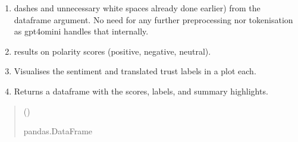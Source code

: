 \documentclass[letterpaper,10pt,english]{sphinxhowto}
\begin{document}
\begin{fulllineitems}
\label{\detokenize{_autosummary/custom_packages.modelling_modules.nlp_modelling.sentiment_analysis_using_gpt:custom_packages.modelling_modules.nlp_modelling.sentiment_analysis_using_gpt}}
\pysigstartsignatures
\pysiglinewithargsret
{}
{}
{}
\pysigstopsignatures\begin{enumerate}
%
\item {} \begin{description}
\sphinxAtStartPar
dashes and unnecessary white spaces already done earlier) from the dataframe argument. No need for any further
preprocessing nor tokenisation as gpt\sphinxhyphen{}4o\sphinxhyphen{}mini handles that internally.

\end{description}

\item {} \begin{description}
\sphinxAtStartPar
results on polarity scores (positive, negative, neutral).

\end{description}

\item {} 
\sphinxAtStartPar
Visualises the sentiment and translated trust labels in a plot each.

\item {} 
\sphinxAtStartPar
Returns a dataframe with the scores, labels, and summary highlights.

\end{enumerate}
\begin{quote}\begin{description}
\sphinxAtStartPar
{} ()

\sphinxAtStartPar
pandas.DataFrame

\end{description}\end{quote}

\end{fulllineitems}
\end{document}
